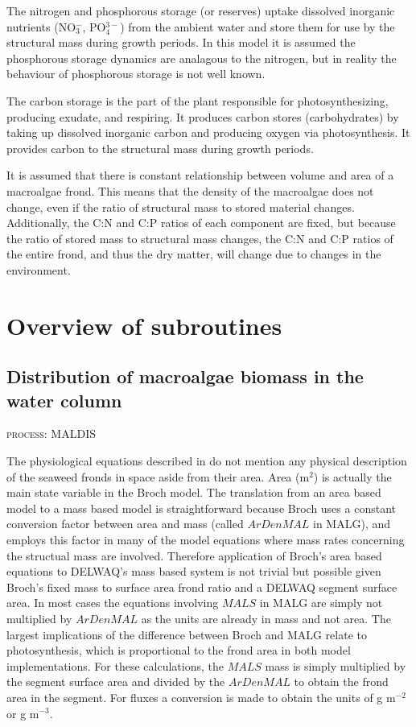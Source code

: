\documentclass{deltares_manual}
\begin{document}
The nitrogen and phosphorous storage (or reserves) uptake dissolved inorganic nutrients (NO$_{3}^{-}$, PO$_{4}^{3-}$) from the ambient water and store them for use by the structural mass during growth periods. In this model it is assumed the phosphorous storage dynamics are analagous to the nitrogen, but in reality the behaviour of phosphorous storage is not well known.

The carbon storage is the part of the plant responsible for photosynthesizing, producing exudate, and respiring. It produces carbon stores (carbohydrates) by taking up dissolved inorganic carbon and producing oxygen via photosynthesis. It provides carbon to the structural mass during growth periods. 

It is assumed that there is constant relationship between volume and area of a macroalgae frond. This means that the density of the macroalgae does not change, even if the ratio of structural mass to stored material changes. Additionally, the C:N and C:P ratios of each component are fixed, but because the ratio of stored mass to structural mass changes, the C:N and C:P ratios of the entire frond, and thus the dry matter, will change due to changes in the environment.
\pagebreak

\chapter{Overview of subroutines}
\section{Distribution of macroalgae biomass in the water column}
\begin{flushright}
	\textsc{process: MALDIS}
\end{flushright}
The physiological equations described in \cite{broch2012} do not mention any physical description of the seaweed fronds in space aside from their area. Area (m$^{2}$) is actually the main state variable in the Broch model. The translation from an area based model to a mass based model is straightforward because Broch uses a constant conversion factor between area and mass (called $ArDenMAL$ in MALG), and employs this factor in many of the model equations where mass rates concerning the structual mass are involved. Therefore application of Broch's area based equations to DELWAQ's mass based system is not trivial but possible given Broch's fixed mass to surface area frond ratio and a DELWAQ segment surface area. In most cases the equations involving $MALS$ in MALG are simply not multiplied by $ArDenMAL$ as the units are already in mass and not area. The largest implications of the difference between Broch and MALG relate to photosynthesis, which is proportional to the frond area in both model implementations. For these calculations, the $MALS$ mass is simply multiplied by the segment surface area and divided by the $ArDenMAL$ to obtain the frond area in the segment. For fluxes a conversion is made to obtain the units of g m$^{-2}$ or g m$^{-3}$.  
\end{document}
